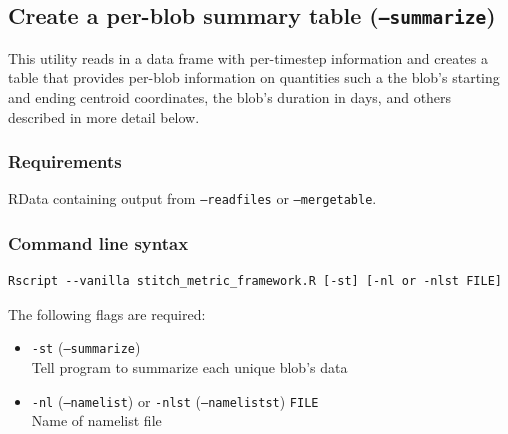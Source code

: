 \documentclass{article}
\begin{document}
\subsection{Create a per-blob summary table (\texttt{--summarize})}\label{summarysection}
This utility reads in a data frame with per-timestep information and creates a table that provides per-blob information on quantities such a the blob's starting and ending centroid coordinates, the blob's duration in days, and others described in more detail below. %

\subsubsection{Requirements}

RData containing output from \texttt{--readfiles} or \texttt{--mergetable}.

\subsubsection{Command line syntax}

\begin{verbatim}
Rscript --vanilla stitch_metric_framework.R [-st] [-nl or -nlst FILE]
\end{verbatim}

The following flags are required:
\begin{itemize}
\item[] \texttt{-st} (\texttt{--summarize})\\ Tell program to summarize each unique blob's data
\item[]\texttt{-nl} (\texttt{--namelist}) or \texttt{-nlst} (\texttt{--namelistst}) \texttt{FILE}\\ Name of namelist file
\end{itemize}
\end{document}
